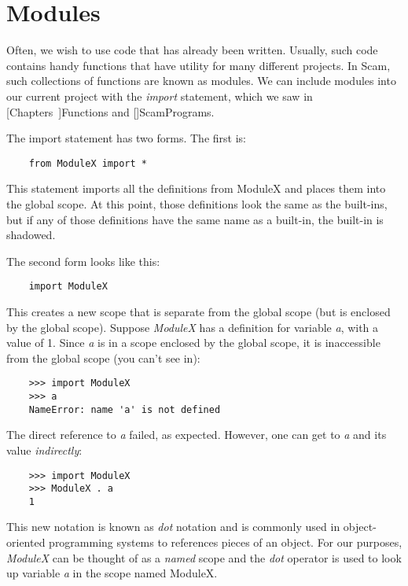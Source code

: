\section{Modules}

Often, we wish to use code that has already been written.
Usually, such code contains handy functions that have
utility for many different projects. In Scam, such
collections of functions are known as modules.
We can include modules into our current project with
the {\it import} statement, which we saw in
[Chapters~\Ref]{Functions}
and
[\Ref]{ScamPrograms}.

The import statement has two forms. The first is:

\begin{verbatim}
    from ModuleX import *
\end{verbatim}

This statement imports all the definitions from ModuleX and places
them into the global scope. At this point, those definitions
look the same as the built-ins, but if any of those definitions
have the same name as a built-in, the built-in is shadowed.

The second form looks like this:

\begin{verbatim}
    import ModuleX
\end{verbatim}

This creates a new scope that is separate from the global scope
(but is enclosed by the global scope).
Suppose
{\it ModuleX} has a definition for variable {\it a}, with a value
of 1.
Since {\it a} is in a scope
enclosed by the global scope, it is inaccessible from the global
scope (you can't see in):

\begin{verbatim}
    >>> import ModuleX
    >>> a
    NameError: name 'a' is not defined
\end{verbatim}

The direct reference to {\it a} failed, as expected.
However, one can get to {\it a} and its value {\it indirectly}:

\begin{verbatim}
    >>> import ModuleX
    >>> ModuleX . a
    1
\end{verbatim}

This new notation is known as {\it dot} notation and is commonly
used in object-oriented programming systems to references pieces
of an object. For our purposes, {\it ModuleX} can be thought
of as
a {\it named} scope and the {\it dot} operator is used to look
up variable {\it a} in the scope named ModuleX.

